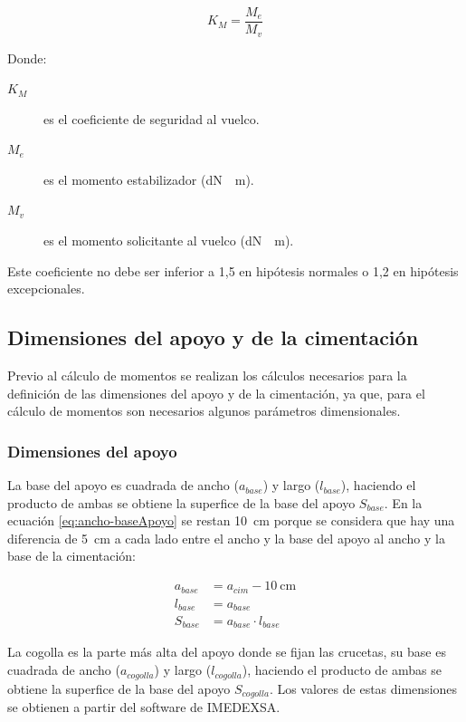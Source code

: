 \begin{equation}
    K_M=\frac{M_e}{M_v}
    \label{eq:coeficiente-seguridad-momento}
\end{equation}

Donde:
\begin{description}
    \item[$K_M$] es el coeficiente de seguridad al vuelco.
    \item[$M_e$] es el momento estabilizador (\si{\deca\newton\cdot\meter}).
    \item[$M_v$] es el momento solicitante al vuelco (\si{\deca\newton\cdot\meter}).
\end{description}

Este coeficiente no debe ser inferior a 1,5 en hipótesis normales o 1,2 en hipótesis excepcionales.

\subsection{Dimensiones del apoyo y de la cimentación}
\label{subsubsec:dimensiones}
Previo al cálculo de momentos se realizan los cálculos necesarios para la definición de las dimensiones del apoyo y de la cimentación, ya que, para el cálculo de momentos son necesarios algunos parámetros dimensionales.
\subsubsection{Dimensiones del apoyo}
\label{subsubsec:dimensiones-apoyo}
La base del apoyo es cuadrada de ancho ($a_{base}$) y largo ($l_{base}$), haciendo el producto de ambas se obtiene la superfice de la base del apoyo $S_{base}$. En la ecuación \eqref{eq:ancho-baseApoyo} se restan \SI{10}{\centi\meter} porque se considera que hay una diferencia de \SI{5}{\centi\meter} a cada lado entre el ancho y la base del apoyo al ancho y la base de la cimentación:

\begin{align}
    a_{base} &= a_{cim}-\SI{10}{\centi\meter}
    \label{eq:ancho-baseApoyo}\\[0.5em]
    l_{base} &= a_{base}
    \label{eq:largo-baseApoyo}\\[0.5em]
    S_{base} &= a_{base}\cdot l_{base}
    \label{eq:superficie-baseApoyo}
\end{align}

La cogolla es la parte más alta del apoyo donde se fijan las crucetas, su base es cuadrada de ancho ($a_{cogolla}$) y largo ($l_{cogolla}$), haciendo el producto de ambas se obtiene la superfice de la base del apoyo $S_{cogolla}$. Los valores de estas dimensiones se obtienen a partir del software de IMEDEXSA.

